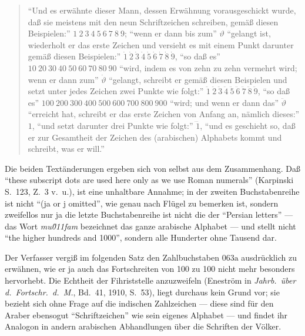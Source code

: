 \documentclass[11pt,a4paper]{article}
\newcommand{\enquote}[1]{``#1''}
\begin{document}
\begin{quote}
\enquote{Und es erw\"ahnte dieser Mann, dessen Erw\"ahnung vorausgeschickt wurde, da\ss{} sie meistens mit den neun Schriftzeichen schreiben, gem\"a\ss{} diesen Beispielen:} $1\ 2\ 3\ 4\ 5\ 6\ 7\ 8\ 9$; \enquote{wenn er dann bis zum} $\vartheta$ \enquote{gelangt ist, wiederholt er das erste Zeichen und versieht es mit einem Punkt darunter gem\"a\ss{} diesen Beispielen:} $\dot{1}\ \dot{2}\ \dot{3}\ \dot{4}\ \dot{5}\ \dot{6}\ \dot{7}\ \dot{8}\ \dot{9}$, \enquote{so da\ss{} es} $10\ 20\ 30\ 40\ 50\ 60\ 70\ 80\ 90$ \enquote{wird, indem es von zehn zu zehn vermehrt wird; wenn er dann zum} $\dot{\vartheta}$ \enquote{gelangt, schreibt er gem\"a\ss{} diesen Beispielen und setzt unter jedes Zeichen zwei Punkte wie folgt:} $\ddot{1}\ \ddot{2}\ \ddot{3}\ \ddot{4}\ \ddot{5}\ \ddot{6}\ \ddot{7}\ \ddot{8}\ \ddot{9}$, \enquote{so da\ss{} es} $100\ 200\ 300\ 400\ 500\ 600\ 700\ 800\ 900$ \enquote{wird; und wenn er dann das} $\ddot{\vartheta}$ \enquote{erreicht hat, schreibt er das erste Zeichen von Anfang an, n\"amlich dieses:} $1$, \enquote{und setzt darunter drei Punkte wie folgt:} $\dddot{1}$, \enquote{und es geschieht so, da\ss{} er zur Gesamtheit der Zeichen des (arabischen) Alphabets kommt und schreibt, was er will.}
\end{quote}

Die beiden Text\"anderungen ergeben sich von selbst aus dem Zusammenhang. Da\ss{} \enquote{these subscript dots are used here only as we use Roman numerals} (Karpinski S.\ 123, Z.\ 3 v.\ u.), ist eine unhaltbare Annahme; in der zweiten Buchstabenreihe ist nicht \enquote{(ja or j omitted}, wie genau nach Fl\"ugel zu bemerken ist, sondern zweifellos nur ja die letzte Buchstabenreihe ist nicht die der \enquote{Persian letters} --- das Wort \textit{mu\u011fam} bezeichnet das ganze arabische Alphabet --- und stellt nicht \enquote{the higher hundreds and 1000}, sondern alle Hunderter ohne Tausend dar.

Der Verfasser vergi\ss{} im folgenden Satz den Zahlbuchstaben $\text{\u063a}$ ausdr\"ucklich zu erw\"ahnen, wie er ja auch das Fortschreiten von 100 zu 100 nicht mehr besonders hervorhebt. Die Echtheit der Fihriststelle anzuzweifeln (Enestr\"om in \textit{Jahrb.\ \"uber d.\ Fortschr.\ d.\ M.}, Bd.\ 41, 1910, S.\ 53), liegt durchaus kein Grund vor; sie bezieht sich ohne Frage auf die indischen Zahlzeichen --- diese sind f\"ur den Araber ebensogut \enquote{Schriftzeichen} wie sein eigenes Alphabet --- und findet ihr Analogon in andern arabischen Abhandlungen \"uber die Schriften der V\"olker.
\end{document}
